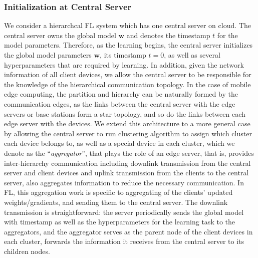 \documentclass[10pt,twocolumn,letterpaper]{article}
\theoremstyle{definition}
\begin{document}
\subsubsection{Initialization at Central Server}%
We consider a hierarchcal FL system which has one central server on cloud. The central server owns the global model $\mathbf{w}$ and denotes the timestamp $t$ for the model parameters. 
Therefore, as the learning begins, the central server initializes the global model parameters $\mathbf{w}$, its timestamp $t=0$, as well as several hyperparameters that are required by learning. 
In addition, given the network information of all client devices, we allow the central server to be responsible for the knowledge of the hierarchical communication topology. 
In the case of mobile edge computing, the partition and hierarchy can be naturally formed by the communication edges, as the links between the central server with the edge servers or base stations form a star topology, and so do the links between each edge server with the devices. We extend this architecture to a more general case by allowing the central server to run clustering algorithm to assign which cluster each device belongs to, as well as a special device in each cluster, which we denote as the ``\textit{aggregator}'', that plays the role of an edge server, that is, provides inter-hierarchy communication including downlink transmission from the central server and client devices and uplink transmission from the clients to the central server, also aggregates information to reduce the necessary communication. In FL, this aggregation work is specific to aggregating of the clients' updated weights/gradients, and sending them to the central server. The downlink transmission is straightforward: the server periodically sends the global model with timestamp as well as the hyperparameters for the learning task to the aggregators, and the aggregator serves as the parent node of the client devices in each cluster, forwards the information it receives from the central server to its children nodes.
\end{document}
